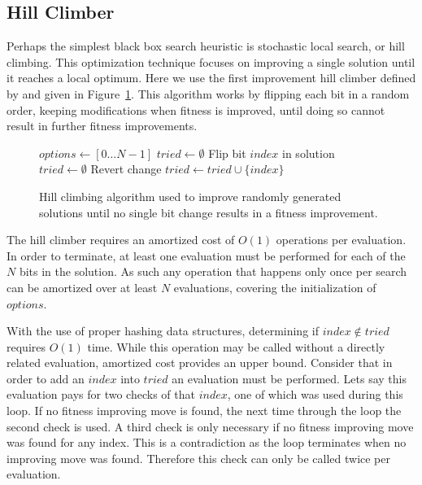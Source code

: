 \documentclass[twoside]{article}
\begin{document}
\subsection{Hill Climber}
Perhaps the simplest black box search heuristic is stochastic local search, or hill climbing.
This optimization technique focuses on improving a single solution until it reaches a local
optimum. Here we use the first improvement hill climber defined by \cite{goldman:2014:p3}
and given in Figure~\ref{fig-hc}. This algorithm works by flipping each bit in a random
order, keeping modifications when fitness is improved, until doing so cannot result in
further fitness improvements.

\begin{figure}
  \begin{algorithmic}[1]
    \State $options \leftarrow [0 \dots N-1]$
    \State $tried \leftarrow \emptyset$
          \State Flip bit $index$ in solution
            \State $tried \leftarrow \emptyset$
          \Else
            \State Revert change
          \EndIf
          \State $tried \leftarrow tried \cup \{index\}$
        \EndIf
      \EndFor
    \EndWhile
  \EndProcedure
\end{algorithmic}
  \caption{Hill climbing algorithm used to improve randomly generated solutions until no single
           bit change results in a fitness improvement.}
  \label{fig-hc}
\end{figure}

The hill climber requires an amortized cost of $O(1)$ operations per evaluation. In order to
terminate, at least one evaluation must be performed for each of the $N$ bits in the solution.
As such any operation that happens only once per search can be amortized over at least $N$
evaluations, covering the initialization of $options$.

With the use of proper hashing data structures, determining if $index \notin tried$ requires $O(1)$
time. While this operation may be called without a directly related evaluation, amortized cost
provides an upper bound. Consider that in order to add an $index$ into $tried$ an evaluation must
be performed. Lets say this evaluation pays for two checks of that $index$, one of which was used
during this loop. If no fitness improving move is found, the next time through the loop the second check
is used. A third check is only necessary if no fitness improving move was found for any index.
This is a contradiction as the loop terminates when no improving move was found. Therefore this check
can only be called twice per evaluation.
\end{document}
